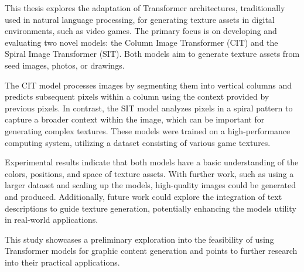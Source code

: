 This thesis explores the adaptation of Transformer architectures, traditionally used in natural language processing, for generating texture assets in digital environments, such as video games. The primary focus is on developing and evaluating two novel models: the Column Image Transformer (CIT) and the Spiral Image Transformer (SIT). Both models aim to generate texture assets from seed images, photos, or drawings.

The CIT model processes images by segmenting them into vertical columns and predicts subsequent pixels within a column using the context provided by previous pixels. In contrast, the SIT model analyzes pixels in a spiral pattern to capture a broader context within the image, which can be important for generating complex textures. These models were trained on a high-performance computing system, utilizing a dataset consisting of various game textures.

Experimental results indicate that both models have a basic understanding of the colors, positions, and space of texture assets. With further work, such as using a larger dataset and scaling up the models, high-quality images could be generated and produced. Additionally, future work could explore the integration of text descriptions to guide texture generation, potentially enhancing the models utility in real-world applications.

This study showcases a preliminary exploration into the feasibility of using Transformer models for graphic content generation and points to further research into their practical applications.